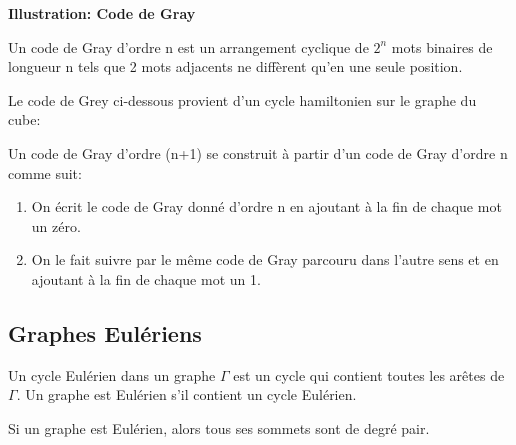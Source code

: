 \newpage

\textbf{Illustration: Code de Gray}

Un code de Gray d'ordre n est un arrangement cyclique de $2^{n}$ mots binaires de longueur n tels que 2 mots adjacents ne diffèrent qu'en une seule position.\\

\begin{exmp}
Le code de Grey ci-dessous provient d'un cycle hamiltonien sur le graphe du cube:\\
\end{exmp}

\begin{figure}[!tbph]
  \centering
  \begin{minipage}[b]{0.4\textwidth}
    
  \end{minipage}
  \hfill
  \begin{minipage}[b]{0.4\textwidth}
    
  \end{minipage}
\end{figure}

Un code de Gray d'ordre (n+1) se construit à partir d'un code de Gray d'ordre n comme suit:

\begin{enumerate}
	\item On écrit le code de Gray donné d'ordre n en ajoutant à la fin de chaque mot un zéro.
	\item On le fait suivre par le même code de Gray parcouru dans l'autre sens et en ajoutant à la fin de chaque mot un 1.
\end{enumerate}


\newpage

\subsection{Graphes Eulériens}

\begin{defn}
Un cycle Eulérien dans un graphe $\Gamma$ est un cycle qui contient toutes les arêtes de $\Gamma$.
Un graphe est Eulérien s'il contient un cycle Eulérien.\\
\end{defn}

\begin{prop}
Si un graphe est Eulérien, alors tous ses sommets sont de degré pair.\\
\end{prop}

